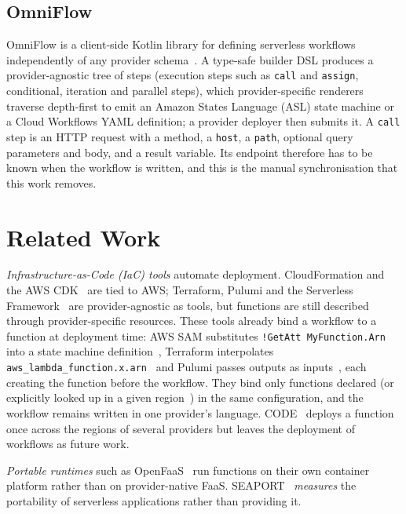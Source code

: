 \documentclass[conference]{IEEEtran}
\begin{document}
\subsection{OmniFlow}
OmniFlow is a client-side Kotlin library for defining serverless workflows independently of any
provider schema~\cite{costa2023omniflow,silva2025advanced}. A type-safe builder DSL produces a
provider-agnostic tree of steps (execution steps such as \texttt{call} and \texttt{assign},
conditional, iteration and parallel steps), which provider-specific renderers traverse depth-first
to emit an Amazon States Language (ASL) state machine or a Cloud Workflows YAML definition; a
provider deployer then submits it. A \texttt{call} step is an HTTP request with a method, a
\texttt{host}, a \texttt{path}, optional query parameters and body, and a result variable. Its
endpoint therefore has to be known when the workflow is written, and this is the manual
synchronisation that this work removes.

\section{Related Work}
\label{sec:related}

\emph{Infrastructure-as-Code (IaC) tools} automate deployment. CloudFormation and the AWS
CDK~\cite{awsCloudFormation,awsCdk} are tied to AWS; Terraform, Pulumi and the Serverless
Framework~\cite{terraform,pulumi,serverlessFramework} are provider-agnostic as tools, but functions
are still described through provider-specific resources. These tools already bind a workflow to a
function at deployment time: AWS SAM substitutes \texttt{!GetAtt MyFunction.Arn} into a state
machine definition~\cite{awsSamStateMachine}, Terraform interpolates
\texttt{aws\_lambda\_function.x.arn}~\cite{terraformSfnStateMachine} and Pulumi passes outputs as
inputs~\cite{pulumiInputsOutputs}, each creating the function before the workflow. They bind only
functions declared (or explicitly looked up in a given region~\cite{terraformLambdaDataSource,pulumiLambdaGetFunction})
in the same configuration, and the workflow remains written in one provider's language.
CODE~\cite{ristov2024code} deploys a function once across the regions of several providers but
leaves the deployment of workflows as future work.

\emph{Portable runtimes} such as OpenFaaS~\cite{openFaaS} run functions on their own container
platform rather than on provider-native FaaS. SEAPORT~\cite{yussupov2020seaport} \emph{measures}
the portability of serverless applications rather than providing it.
\end{document}
